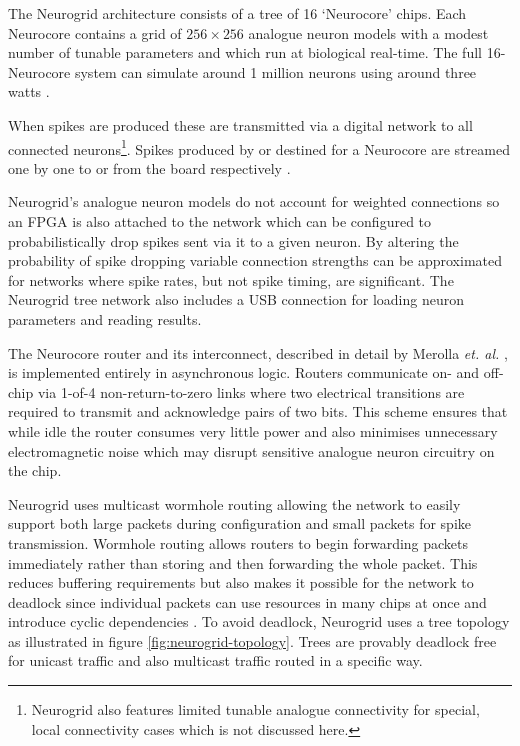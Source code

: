 				The Neurogrid architecture consists of a tree of 16 `Neurocore' chips.
				Each Neurocore contains a grid of $256 \times 256$ analogue neuron
				models with a modest number of tunable parameters and which run at
				biological real-time. The full 16-Neurocore system can simulate around 1
				million neurons using around three watts \cite{benjamin14}.
				
				When spikes are produced these are transmitted via a digital network to
				all connected neurons\footnote{Neurogrid also features limited tunable
				analogue connectivity for special, local connectivity cases which is not
				discussed here.}. Spikes produced by or destined for a Neurocore are
				streamed one by one to or from the board respectively
				\cite{boahen04,boahen04receiver}.
				
				Neurogrid's analogue neuron models do not account for weighted
				connections so an FPGA is also attached to the network which can be
				configured to probabilistically drop spikes sent via it to a given
				neuron. By altering the probability of spike dropping variable
				connection strengths can be approximated for networks where spike rates,
				but not spike timing, are significant. The Neurogrid tree network also
				includes a USB connection for loading neuron parameters and reading
				results. 
				
				The Neurocore router and its interconnect, described in detail by
				Merolla \emph{et. al.} \cite{merolla14}, is implemented entirely in
				asynchronous logic. Routers communicate on- and off-chip via 1-of-4
				non-return-to-zero links where two electrical transitions are
				required to transmit and acknowledge pairs of two bits. This scheme
				ensures that while idle the router consumes very little power and also
				minimises unnecessary electromagnetic noise which may disrupt sensitive
				analogue neuron circuitry on the chip.
				
				Neurogrid uses multicast wormhole routing allowing the network to easily
				support both large packets during configuration and small packets for
				spike transmission. Wormhole routing allows routers to begin forwarding
				packets immediately rather than storing and then forwarding the whole
				packet. This reduces buffering requirements but also makes it possible
				for the network to deadlock since individual packets can use resources
				in many chips at once and introduce cyclic dependencies \cite{dally04}.
				To avoid deadlock, Neurogrid uses a tree topology as illustrated in
				figure \ref{fig:neurogrid-topology}.  Trees are provably deadlock free
				for unicast traffic and also multicast traffic routed in a specific way.
				
